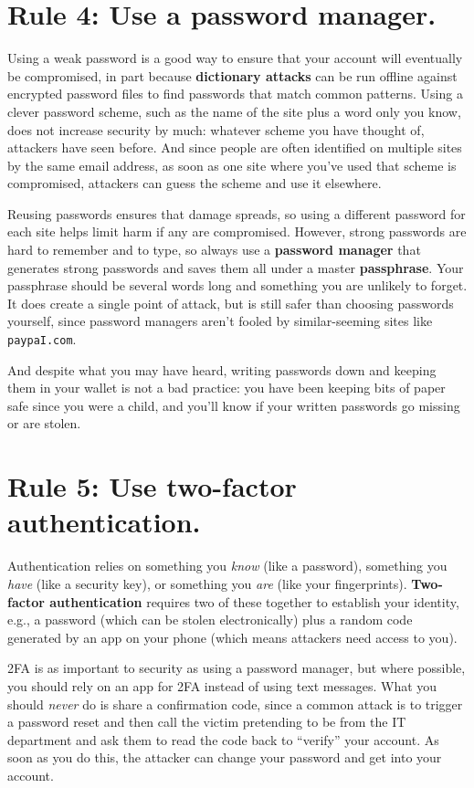 \documentclass[10pt,letterpaper]{article}
\newcommand{\rulemajor}[1]{\section*{#1}}
\begin{document}
\rulemajor{Rule 4: Use a password manager.}

Using a weak password is a good way to ensure that your account will eventually be compromised,
in part because \textbf{dictionary attacks} can be run offline against encrypted password files
to find passwords that match common patterns.
Using a clever password scheme,
such as the name of the site plus a word only you know,
does not increase security by much:
whatever scheme you have thought of,
attackers have seen before.
And since people are often identified on multiple sites by the same email address,
as soon as one site where you've used that scheme is compromised,
attackers can guess the scheme and use it elsewhere.

Reusing passwords ensures that damage spreads,
so using a different password for each site helps limit harm if any are compromised.
However,
strong passwords are hard to remember and to type,
so always use a \textbf{password manager}
that generates strong passwords
and saves them all under a master \textbf{passphrase}.
Your passphrase should be several words long
and something you are unlikely to forget.
It does create a single point of attack,
but is still safer than choosing passwords yourself,
since password managers aren't fooled by similar-seeming sites like \texttt{paypaI.com}.

And despite what you may have heard,
writing passwords down and keeping them in your wallet is not a bad practice:
you have been keeping bits of paper safe since you were a child,
and you'll know if your written passwords go missing or are stolen.

\rulemajor{Rule 5: Use two-factor authentication.}

Authentication relies on something you \emph{know} (like a password),
something you \emph{have} (like a security key),
or something you \emph{are} (like your fingerprints).
\textbf{Two-factor authentication} requires two of these together to establish your identity,
e.g.,
a password (which can be stolen electronically)
plus a random code generated by an app on your phone
(which means attackers need access to you).

2FA is as important to security as using a password manager,
but where possible,
you should rely on an app for 2FA instead of using text messages.
What you should \emph{never} do is share a confirmation code,
since a common attack is to trigger a password reset
and then call the victim pretending to be from the IT department
and ask them to read the code back to ``verify'' your account.
As soon as you do this,
the attacker can change your password and get into your account.
\end{document}
